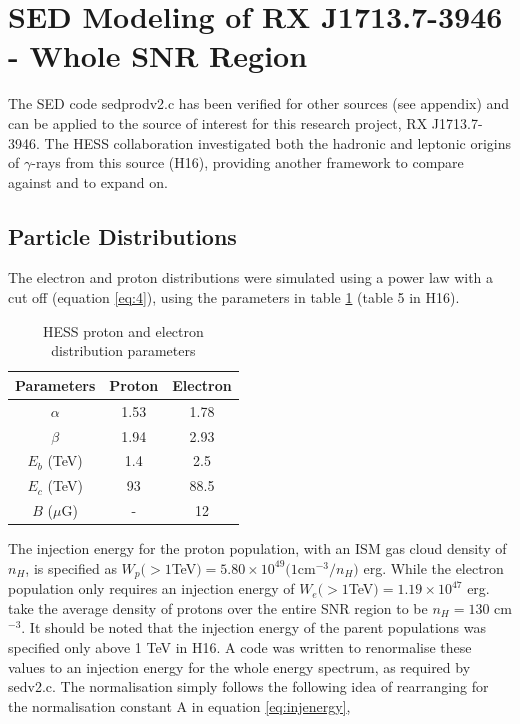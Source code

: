 \documentclass[12pt,a4paper]{article}
\begin{document}
\newpage
\section{SED Modeling of RX J1713.7-3946 - Whole SNR Region} \label{sec:seds}


The SED code sedprodv2.c has been verified for other sources (see appendix) and can be applied to the source of interest for this research project, RX J1713.7-3946. The HESS collaboration investigated both the hadronic and leptonic origins of $\gamma$-rays from this source (H16), providing another framework to compare against and to expand on. 

\subsection{Particle Distributions}
The electron and proton distributions were simulated using a power law with a cut off (equation \ref{eq:4}), using the parameters in table \ref{tab:paramshess} (table 5 in H16).
\begin{table}[H] 
	\begin{center}
		\begin{tabular}{ccc}
			\toprule
			Parameters & Proton & Electron \\ 
			\hline 
			$\alpha$& 1.53 & 1.78 \\ 
			$\beta$& 1.94 & 2.93 \\ 
			$E_{b}$ (TeV)& 1.4 & 2.5 \\ 
			$E_{c}$ (TeV)& 93 & 88.5 \\ 
			$B$ ($\mu$G) & - & 12\\
			\bottomrule
		\end{tabular} 
	\end{center}
	\caption{HESS proton and electron distribution parameters}
	\label{tab:paramshess}
\end{table}
The injection energy for the proton population, with an ISM gas cloud density of $n_H$, is specified as $W_p(>1 $TeV$) = 5.80 \times 10^{49}(1 $cm$^{-3}/n_H)$ erg. While the electron population only requires an injection energy of $W_e(>1 $TeV$) = 1.19 \times 10^{47}$ erg. \cite{2012ApJ...746...82F} take the average density of protons over the entire SNR region to be $n_H = 130$ cm$^{-3}$. It should be noted that the injection energy of the parent populations was specified only above 1 TeV in H16. A code was written to renormalise these values to an injection energy for the whole energy spectrum, as required by sedv2.c. The normalisation simply follows the following idea of rearranging for the normalisation constant A in equation \ref{eq:injenergy},
\end{document}
